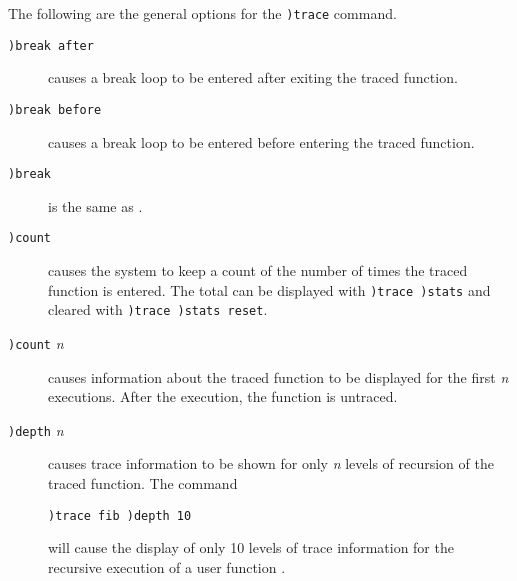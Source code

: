 {{{{{{{The following are the general options for the {\tt )trace}
command.

\begin{description}


\item[{\tt )break after}]
causes a \Lisp{} break loop to be entered after
exiting the traced function.

\item[{\tt )break before}]
causes a \Lisp{} break loop to be entered before
entering the traced function.

\item[{\tt )break}]
is the same as .


\item[{\tt )count}]
causes the system to keep a count of the number of times the
traced function is entered.  The total can be displayed with
{\tt )trace )stats} and cleared with {\tt )trace )stats reset}.

\item[{\tt )count} {\it n}]
causes information about the traced function to be displayed for
the first {\it n} executions.  After the  execution, the
function is untraced.

\item[{\tt )depth} {\it n}]
causes trace information to be shown for only {\it n} levels of
recursion of the traced function.  The command
\begin{verbatim}
)trace fib )depth 10
\end{verbatim}
will cause the display of only 10 levels of trace information for
the recursive execution of a user function .


\end{description}}}}}}}}
